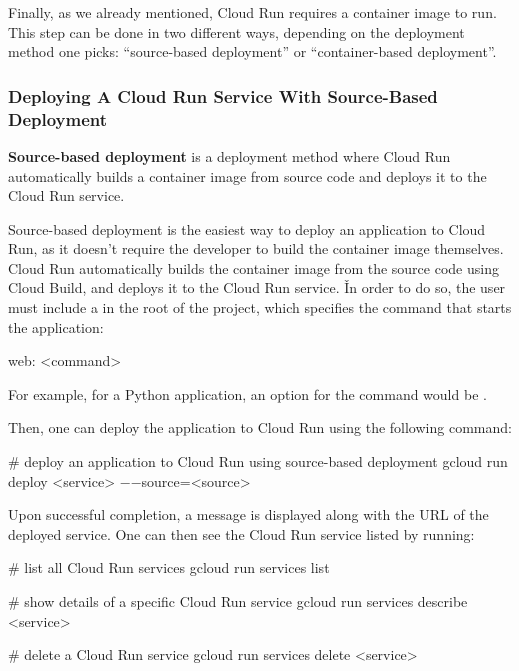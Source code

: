 Finally, as we already mentioned, Cloud Run requires a container image to run. This step can be done in two different
ways, depending on the deployment method one picks: ``source-based deployment'' or ``container-based deployment''.

\subsubsection{Deploying A Cloud Run Service With Source-Based Deployment}

\textbf{Source-based deployment} is a deployment method where Cloud Run automatically builds a container image from
source code and deploys it to the Cloud Run service.
\ed

Source-based deployment is the easiest way to deploy an application to Cloud Run, as it doesn't require the developer
to build the container image themselves. Cloud Run automatically builds the container image from the source code
using Cloud Build, and deploys it to the Cloud Run service. \v

In order to do so, the user must include a  in the root of the project, which specifies the command that
starts the application:
\begin{block}
web: <command>
\end{block}

\be
For example, for a Python application, an option for the command would be .
\ee

Then, one can deploy the application to Cloud Run using the following command:
\begin{bash}
# deploy an application to Cloud Run using source-based deployment
gcloud run deploy <service> $-$$-$source=<source>
\end{bash}

Upon successful completion, a message is displayed along with the URL of the deployed service. One can then see the
Cloud Run service listed by running:
\begin{bash}
# list all Cloud Run services
gcloud run services list
\end{bash}

\begin{bash}
# show details of a specific Cloud Run service
gcloud run services describe <service>
\end{bash}

\begin{bash}
# delete a Cloud Run service
gcloud run services delete <service>
\end{bash}

